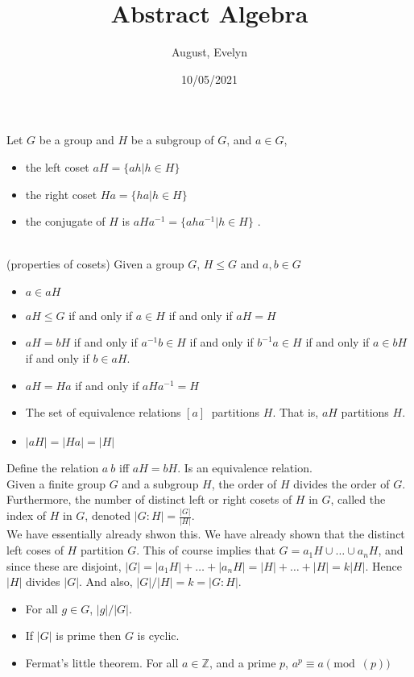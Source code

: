 \documentclass{article}
\title{Abstract Algebra}
\author{August, Evelyn}
\date{10/05/2021}
\newcommand{\Z}{\mathbb{Z}}
\begin{document}
 Let $G$ be a group and $H$ be a subgroup of $G$, and $a\in G$, 
\begin{itemize}
    \item the left coset $aH = \{ah | h\in H\}$
    \item the right coset $Ha = \{ha| h\in H\}$
    \item the conjugate of $H$ is $aHa^{-1} =\{aha^{-1}|h\in H\}$ .

\end{itemize}\\

(properties of cosets) Given a group $G$, $H\le G$ and $a,b\in G$
\begin{itemize}
    \item $a\in aH$
    \item $aH\le G$ if and only if $a\in H$ if and only if $aH = H$
    \item $aH = bH$ if and only if $a^{-1}b\in H$ if and only if $b^{-1}a\in H$ if and only if $a\in bH$ if and only if $b\in aH$.
    \item $aH = Ha$ if and only if $aHa^{-1} = H$
    \item The set of equivalence relations $[a]_~$ partitions $H$. That is, $aH$ partitions $H$.
    \item $|aH| = |Ha| = |H|$
\end{itemize}

 Define the relation $a~b$ iff $aH= bH$. Is an equivalence relation.\\

 Given a finite group $G$ and a subgroup $H$, the order of $H$ divides the order of $G$. Furthermore, the number of distinct left or right cosets of $H$ in $G$, called the index of $H$ in $G$, denoted $|G:H| = \frac{|G|}{|H|}$.\\
 We have essentially already shwon this. We have already shown that the distinct left coses of $H$ partition $G$. This of course implies that $G = a_1H\cup\dots\cup a_nH $, and since these are disjoint, $|G| = |a_1H| + \dots + |a_n H| = |H|+\dots+|H| = k|H|.$ Hence $|H|$ divides $|G|$. And also, $|G|/|H| = k = |G:H|.$\\

\begin{itemize}
    \item For all $g\in G$, $|g|/|G|.$
    \item If $|G|$ is prime then $G$ is cyclic.
    \item Fermat's little theorem. For all $a\in \Z$,  and a prime $p$, $a^p\equiv a\pmod(p)$
\end{itemize}
\end{document}
